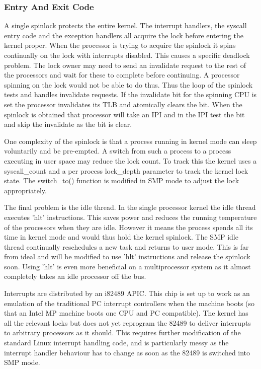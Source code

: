\documentclass[]{article}
\begin{document}
\subsubsection{Entry And Exit Code}
A single spinlock protects the entire kernel. The interrupt handlers, the 
syscall entry code and the exception handlers all acquire the lock before 
entering the kernel proper. When the processor is trying to acquire the 
spinlock it spins continually on the lock with interrupts disabled. This 
causes a specific deadlock problem. The lock owner may need to send an 
invalidate request to the rest of the processors and wait for these to 
complete before continuing. A processor spinning on the lock would not be 
able to do thus. Thus the loop of the spinlock tests and handles invalidate 
requests. If the invalidate bit for the spinning CPU is set the processor 
invalidates its TLB and atomically clears the bit. When the spinlock is 
obtained that processor will take an IPI and in the IPI test the bit and 
skip the invalidate as the bit is clear.

One complexity of the spinlock is that a process running in kernel mode 
can sleep voluntarily and be pre-empted. A switch from such a process to a 
process executing in user space may reduce the lock count. To track this 
the kernel uses a syscall\_count and a per process lock\_depth parameter to 
track the kernel lock state. The switch\_to() function is modified in SMP 
mode to adjust the lock appropriately.

The final problem is the idle thread. In the single processor kernel the 
idle thread executes 'hlt' instructions. This saves power and reduces the 
running temperature of the processors when they are idle. However it means 
the process spends all its time in kernel mode and would thus hold the 
kernel spinlock. The SMP idle thread continually reschedules a new task and 
returns to user mode. This is far from ideal and will be modified to use 
'hlt' instructions and release the spinlock soon. Using 'hlt' is even more 
beneficial on a multiprocessor system as it almost completely takes an idle 
processor off the bus.

Interrupts are distributed by an i82489 APIC. This chip is set up to work 
as an emulation of the traditional PC interrupt controllers when the 
machine boots (so that an Intel MP machine boots one CPU and PC 
compatible). The kernel has all the relevant locks but does not yet 
reprogram the 82489 to deliver interrupts to arbitrary processors as it 
should. This requires further modification of the standard Linux interrupt 
handling code, and is particularly messy as the interrupt handler behaviour 
has to change as soon as the 82489 is switched into SMP mode.
\end{document}
